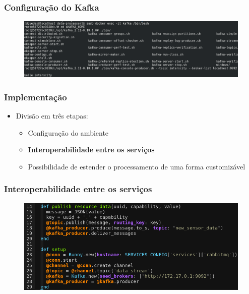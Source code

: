 \documentclass{beamer}
\begin{document}
  \begin{frame}
      \frametitle{Configuração do Kafka}
      \begin{figure}
          \includegraphics[width=\textwidth]{figures/KafkaReady.png}
      \end{figure}
  \end{frame}

  \begin{frame}
      \frametitle{Implementação}
      \begin{itemize}
          \item Divisão em três etapas:
              \begin{itemize}
                  \item Configuração do ambiente
                  \item \textbf{Interoperabilidade entre os serviços}
                  \item Possibilidade de estender o processamento de uma forma customizável
              \end{itemize}
      \end{itemize}
  \end{frame}

  \begin{frame}
      \frametitle{Interoperabilidade entre os serviços}
      \begin{figure}
          \includegraphics[scale=0.3]{figures/ResourceAdaptor.png}
      \end{figure}
  \end{frame}
\end{document}
